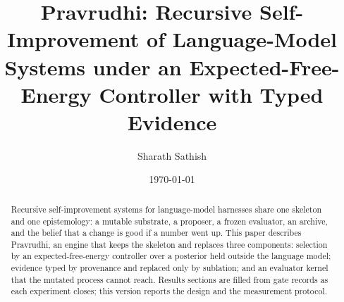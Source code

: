 \documentclass[11pt,a4paper]{article}
\title{Pravrudhi: Recursive Self-Improvement of Language-Model Systems under an Expected-Free-Energy Controller with Typed Evidence}
\author{Sharath Sathish}
\date{\today}
\begin{document}
\maketitle

\begin{abstract}
Recursive self-improvement systems for language-model harnesses share one skeleton and one epistemology: a mutable substrate, a proposer, a frozen evaluator, an archive, and the belief that a change is good if a number went up. This paper describes Pravrudhi, an engine that keeps the skeleton and replaces three components: selection by an expected-free-energy controller over a posterior held outside the language model; evidence typed by provenance and replaced only by sublation; and an evaluator kernel that the mutated process cannot reach. Results sections are filled from gate records as each experiment closes; this version reports the design and the measurement protocol.
\end{abstract}











\end{document}
